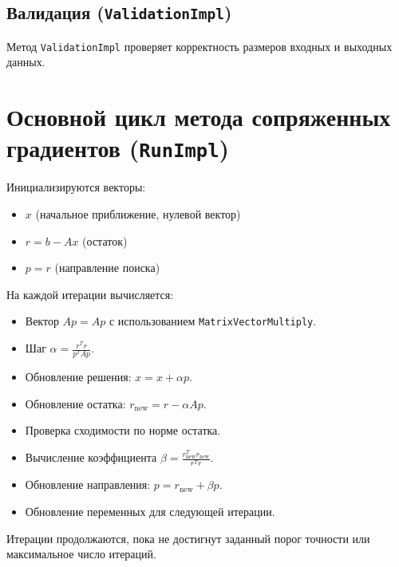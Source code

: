 \documentclass[12pt]{article}
\begin{document}
\subsection{Валидация (\texttt{ValidationImpl})}
Метод \texttt{ValidationImpl} проверяет корректность размеров входных и выходных данных.

\section{Основной цикл метода сопряженных градиентов (\texttt{RunImpl})}
Инициализируются векторы:
\begin{itemize}
    \item \( x \) (начальное приближение, нулевой вектор)
    \item \( r = b - Ax \) (остаток)
    \item \( p = r \) (направление поиска)
\end{itemize}

На каждой итерации вычисляется:
\begin{itemize}
    \item Вектор \( Ap = A p \) с использованием \texttt{MatrixVectorMultiply}.
    \item Шаг \( \alpha = \frac{r^T r}{p^T A p} \).
    \item Обновление решения: \( x = x + \alpha p \).
    \item Обновление остатка: \( r_{\text{new}} = r - \alpha A p \).
    \item Проверка сходимости по норме остатка.
    \item Вычисление коэффициента \( \beta = \frac{r_{\text{new}}^T r_{\text{new}}}{r^T r} \).
    \item Обновление направления: \( p = r_{\text{new}} + \beta p \).
    \item Обновление переменных для следующей итерации.
\end{itemize}

Итерации продолжаются, пока не достигнут заданный порог точности или максимальное число итераций.
\end{document}
